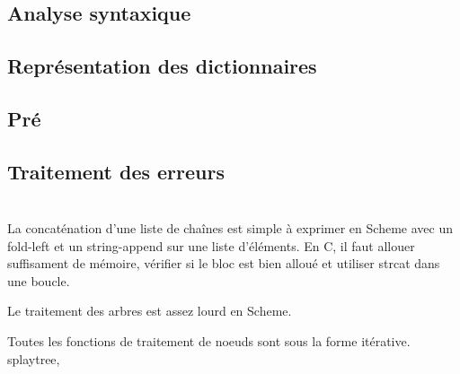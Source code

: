 \documentclass{article}
\begin{document}
  \section{}

  \subsection{Analyse syntaxique}

  \subsection{Représentation des dictionnaires}

  \subsection{Pré}

  \subsection{Traitement des erreurs}

  \section{}

  La concaténation d'une liste de chaînes est simple à exprimer en Scheme avec
  un \textsf{fold-left} et un \textsf{string-append} sur une liste d'éléments.
  En C, il faut allouer suffisament de mémoire, vérifier si le bloc est bien
  alloué et utiliser \textsf{strcat} dans une boucle.

  Le traitement des arbres est assez lourd en Scheme.

  Toutes les fonctions de traitement de noeuds sont sous la forme itérative.
  \textsf{splaytree}, \textsf{}

  \section{}
\end{document}
